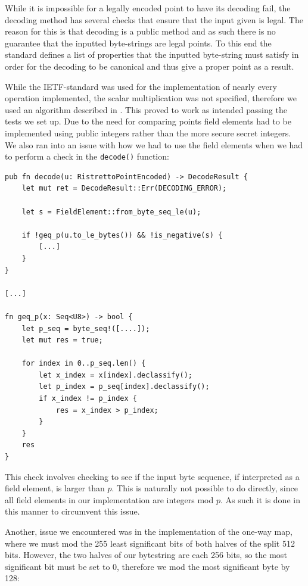 \documentclass{article}
\begin{document}
While it is impossible for a legally encoded point to have its decoding
fail, the decoding method has several checks that ensure that the input
given is legal. The reason for this is that decoding is a public method
and as such there is no guarantee that the inputted byte-strings are
legal points. To this end the standard defines a list of properties
that the inputted byte-string must satisfy in order for the decoding
to be canonical and thus give a proper point as a result.

While the IETF-standard was used for the implementation of nearly every
operation implemented, the scalar multiplication was not specified,
therefore we used an algorithm described in \cite{elliptic-curves}. This
proved to work as intended passing the tests we set up. Due to the
need for comparing points field elements had to be implemented using
public integers rather than the more secure secret integers. We also
ran into an issue with how we had to use the field elements when we
had to perform a check in the \texttt{decode()} function:

\begin{lstlisting}
pub fn decode(u: RistrettoPointEncoded) -> DecodeResult {
	let mut ret = DecodeResult::Err(DECODING_ERROR);

	let s = FieldElement::from_byte_seq_le(u);

	if !geq_p(u.to_le_bytes()) && !is_negative(s) {
		[...]
	}
}

[...]

fn geq_p(x: Seq<U8>) -> bool {
	let p_seq = byte_seq!([....]);
	let mut res = true;

	for index in 0..p_seq.len() {
		let x_index = x[index].declassify();
		let p_index = p_seq[index].declassify();
		if x_index != p_index {
			res = x_index > p_index;
		}
	}
	res
}
\end{lstlisting}

This check involves checking to see if the input byte sequence,
if interpreted as a field element, is larger than $p$. This is
naturally not possible to do directly, since all field elements in
our implementation are integers mod $p$. As such it is done in this
manner to circumvent this issue.

Another, issue we encountered was in the implementation of the one-way
map, where we must mod the 255 least significant bits of both halves
of the split 512 bits. However, the two halves of our bytestring are
each 256 bits, so the most significant bit must be set to 0, therefore
we mod the most significant byte by 128:
\end{document}
